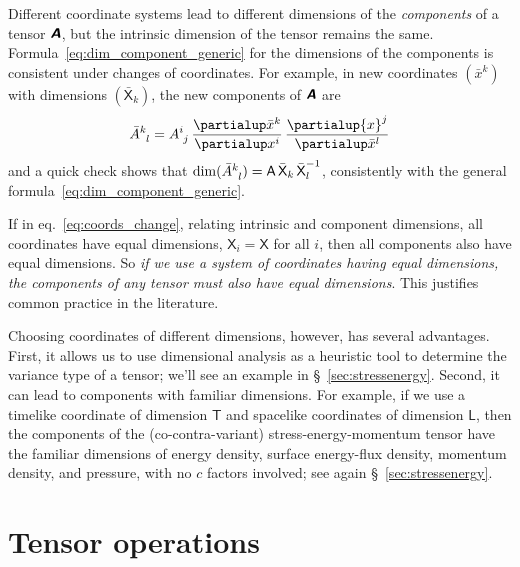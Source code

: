\documentclass[\ifafour a4paper,12pt,\else a5paper,10pt,\fi%
onecolumn,oneside,article,%
british%
]{memoir}
\theoremstyle{remark}
\theoremstyle{innote}
\newcommand*{\mathte}[1]{\textbf{\textit{\textsf{#1}}}}
\newcommand*{\de}{\partialup}%
\renewcommand*{\|}[1][]{\nonscript\,#1\vert\nonscript\;\mathopen{}}
\newcommand*{\sect}{\S}%
\newcommand*{\eqn}{eq.}%
\newcommand*{\Le}{\textsf{L}}
\newcommand*{\Ti}{\textsf{T}}
\newcommand*{\Cu}{\textsf{I}}
\newcommand*{\Xx}{\textsf{X}}
\newcommand*{\Aa}{\textsf{A}}
\newcommand*{\yA}{\mathte{A}}
\renewcommand*{\i}{\indices}
\begin{document}
\medskip

Different coordinate systems lead to different dimensions of the
\emph{components} of a tensor $\yA$, but the intrinsic dimension of the
tensor remains the same. Formula~\eqref{eq:dim_component_generic} for the
dimensions of the components is consistent under changes of coordinates.
For example, in new coordinates $({\bar{x}}^{k})$ with dimensions
$({\bar{\Xx}}_{k})$, the new components of $\yA$ are
\begin{equation}
  \label{eq:coords_change}
  \bar{A}\i{^{k}_{l}} = A\i{^{i}_{j}}
  \,\frac{\de \bar{x}^{k}}{\de x^{i}}
  \,\frac{\de {x}^{j}}{\de \bar{x}^{l}}
\end{equation}
and a quick check shows that
$\dim(\bar{A}\i{^{k}_{l}}) = \Aa\,\bar{\Xx}_{k}\,{\bar{\Xx}_{l}}^{-1}$, consistently
with the general formula~\eqref{eq:dim_component_generic}. %


\medskip

If in \eqn~\eqref{eq:coords_change}, relating intrinsic and component
dimensions, all coordinates have equal dimensions, $\Xx_{i} =\Xx$ for all
$i$, then all components also have equal dimensions. So \emph{if we use a
  system of coordinates having equal dimensions, the components of any
  tensor must also have equal dimensions}. This justifies common practice
in the literature.

Choosing coordinates of different dimensions, however, has several
advantages. First, it allows us to use dimensional analysis as a heuristic
tool to determine the variance type of a tensor; we'll see an example in
\sect~\ref{sec:stressenergy}. Second, it can lead to components with
familiar dimensions. For example, if we use a timelike coordinate of
dimension $\Ti$ and spacelike coordinates of dimension $\Le$, then the
components of the (co-contra-variant) stress-energy-momentum tensor have
the familiar dimensions of energy density, surface energy-flux density,
momentum density, and pressure, with no $c$ factors involved; see again
\sect~\ref{sec:stressenergy}.



\section{Tensor operations}
\label{sec:tensor_ops}
\end{document}
